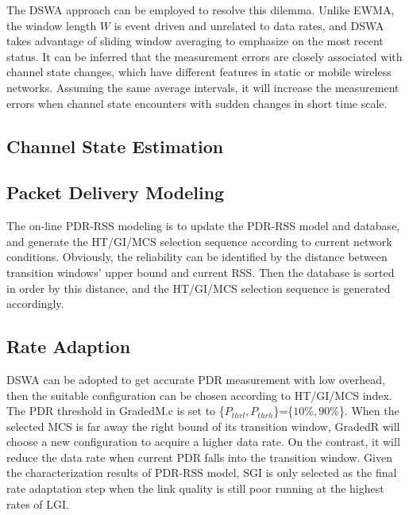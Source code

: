 \documentclass[draftclsnofoot,journal,onecolumn,11pt]{IEEEtran}
\begin{document}
The DSWA approach can be employed to resolve this dilemma. Unlike EWMA, the window length $W$ is event driven and unrelated to data rates, and DSWA takes advantage of sliding window averaging to emphasize on the most recent status. It can be inferred that the measurement errors are closely associated with channel state changes, which have different features in static or mobile wireless networks. Assuming the same average intervals, it will increase the measurement errors when channel state encounters with sudden changes in short time scale.


\subsection{Channel State Estimation} \label{sect:extimation}

\subsection{Packet Delivery Modeling} \label{sect:modeling}

The on-line PDR-RSS modeling is to update the PDR-RSS model and database, and generate the HT/GI/MCS selection sequence according to current network conditions. Obviously, the reliability can be identified by the distance between transition windows' upper bound and current RSS. Then the database is sorted in order by this distance, and the HT/GI/MCS selection sequence is generated accordingly.

\subsection{Rate Adaption} \label{sect:adaption}

DSWA can be adopted to get accurate PDR measurement with low overhead, then the suitable configuration can be chosen according to HT/GI/MCS index. The PDR threshold in GradedM.c is set to \{$P_{thrl},P_{thrh}$\}=\{$10\%,90\%$\}. When the selected MCS is far away the right bound of its transition window, GradedR will choose a new configuration to acquire a higher data rate. On the contrast, it will reduce the data rate when current PDR falls into the transition window. Given the characterization results of PDR-RSS model, SGI is only selected as the final rate adaptation step when the link quality is still poor running at the highest rates of LGI.
\end{document}
